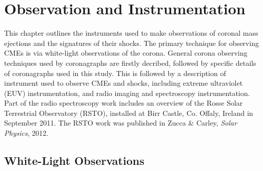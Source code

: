 
\singlespacing
\chapter{Observation and Instrumentation} 
\label{chap:3}
\doublespacing
This chapter outlines the instruments used to make observations of coronal mass ejections and the signatures of their shocks. The primary technique for observing CMEs is via white-light observations of the corona. General corona observing techniques used by coronagraphs are firstly decribed, followed by specific details of coronagraphs used in this study. This is followed by a description of instrument used to observe CMEs and shocks, including extreme ultraviolet (EUV) instrumentation, and radio imaging and spectroscopy instrumentation. Part of the radio spectroscopy work includes an overview of the Rosse Solar Terrestrial Observatory (RSTO), installed at Birr Castle, Co. Offaly, Ireland in September 2011. The RSTO work was published in Zucca \& Carley, {\it Solar Physics}, 2012.
\clearpage

\section{White-Light Observations}\label{sec:1}


